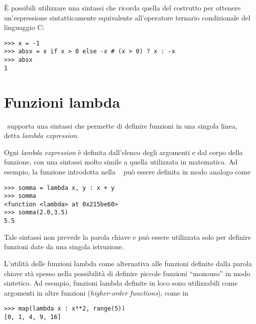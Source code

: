 \`E possibili utilizzare una sintassi che ricorda quella del costrutto
 per ottenere un'espressione sintatticamente equivalente
all'operatore ternario condizionale  del linguaggio C:
\begin{verbatim}
>>> x = -1
>>> absx = x if x > 0 else -x # (x > 0) ? x : -x
>>> absx
1
\end{verbatim}

\section{Funzioni lambda}

\python\ supporta una sintassi che permette di definire funzioni in
una singola linea, detta \emph{lambda expression}.

Ogni \emph{lambda expression} \`e definita dall'elenco degli argomenti
e dal corpo della funzione, con una sintassi molto simile a quella
utilizzata in matematica. Ad esempio, la funzione 
introdotta nella ~ pu\`o essere definita in
modo analogo come
\begin{verbatim}
>>> somma = lambda x, y : x + y
>>> somma
<function <lambda> at 0x215be60>
>>> somma(2.0,3.5)
5.5
\end{verbatim}
Tale sintassi non prevede la parola chiave  e pu\`o
essere utilizzata solo per definire funzioni date da una singola
istruzione.

L'utilit\`a delle funzioni lambda come alternativa alle funzioni
definite dalla parola chiave  st\`a spesso nella
possibilit\`a di definire piccole funzioni ``monouso'' in modo
sintetico. Ad esempio, funzioni lambda definite in loco sono
utilizzabili come argomenti in altre funzioni (\emph{higher-order
functions}), come in
\begin{verbatim}
>>> map(lambda x : x**2, range(5))
[0, 1, 4, 9, 16]
\end{verbatim}

